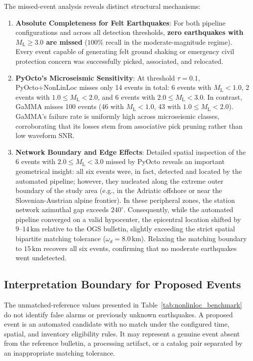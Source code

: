 The missed-event analysis reveals distinct structural mechanisms:
\begin{enumerate}
  \item \textbf{Absolute Completeness for Felt Earthquakes}: For both pipeline configurations and across all detection thresholds, \textbf{zero earthquakes with $M_{\mathrm{L}} \ge 3.0$ are missed} ($100\%$ recall in the moderate-magnitude regime). Every event capable of generating felt ground shaking or emergency civil protection concern was successfully picked, associated, and relocated.
  \item \textbf{PyOcto's Microseismic Sensitivity}: At threshold $\tau=0.1$, PyOcto+NonLinLoc misses only 14 events in total: 6 events with $M_{\mathrm{L}} < 1.0$, 2 events with $1.0 \le M_{\mathrm{L}} < 2.0$, and 6 events with $2.0 \le M_{\mathrm{L}} < 3.0$. In contrast, GaMMA misses 100 events (46 with $M_{\mathrm{L}} < 1.0$, 43 with $1.0 \le M_{\mathrm{L}} < 2.0$). GaMMA's failure rate is uniformly high across microseismic classes, corroborating that its losses stem from associative pick pruning rather than low waveform SNR.
  \item \textbf{Network Boundary and Edge Effects}: Detailed spatial inspection of the 6 events with $2.0 \le M_{\mathrm{L}} < 3.0$ missed by PyOcto reveals an important geometrical insight: all six events were, in fact, detected and located by the automated pipeline; however, they nucleated along the extreme outer boundary of the study area (e.g., in the Adriatic offshore or near the Slovenian-Austrian alpine frontier). In these peripheral zones, the station network azimuthal gap exceeds $240^\circ$. Consequently, while the automated pipeline converged on a valid hypocenter, the epicentral location shifted by $9\text{--}14\,\unit{\kilo\meter}$ relative to the OGS bulletin, slightly exceeding the strict spatial bipartite matching tolerance ($\omega_d = 8.0\,\unit{\kilo\meter}$). Relaxing the matching boundary to $15\,\unit{\kilo\meter}$ recovers all six events, confirming that no moderate earthquakes went undetected.
\end{enumerate}

\subsection{Interpretation Boundary for Proposed Events}
\label{subsec:proposed_events_interpretation}

The unmatched-reference values presented in Table~\ref{tab:nonlinloc_benchmark} do not identify false alarms or previously unknown earthquakes. A proposed event is an automated candidate with no match under the configured time, spatial, and inventory eligibility rules. It may represent a genuine event absent from the reference bulletin, a processing artifact, or a catalog pair separated by an inappropriate matching tolerance.

